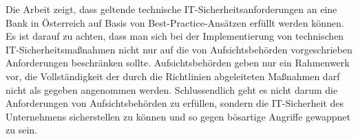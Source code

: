 \bigbreak
Die Arbeit zeigt, dass geltende technische IT-Sicherheitsanforderungen an eine Bank in Österreich auf Basis von Best-Practice-Ansätzen erfüllt werden können. Es ist darauf zu achten, dass man sich bei der Implementierung von technischen IT-Sicherheitsmaßnahmen nicht nur auf die von Aufsichtsbehörden vorgeschrieben Anforderungen beschränken sollte. Aufsichtsbehörden geben nur ein Rahmenwerk vor, die Vollständigkeit der durch die Richtlinien abgeleiteten Maßnahmen darf nicht als gegeben angenommen werden. Schlussendlich geht es nicht darum die Anforderungen von Aufsichtsbehörden zu erfüllen, sondern die IT-Sicherheit des Unternehmens sicherstellen zu können und so gegen bösartige Angriffe gewappnet zu sein.